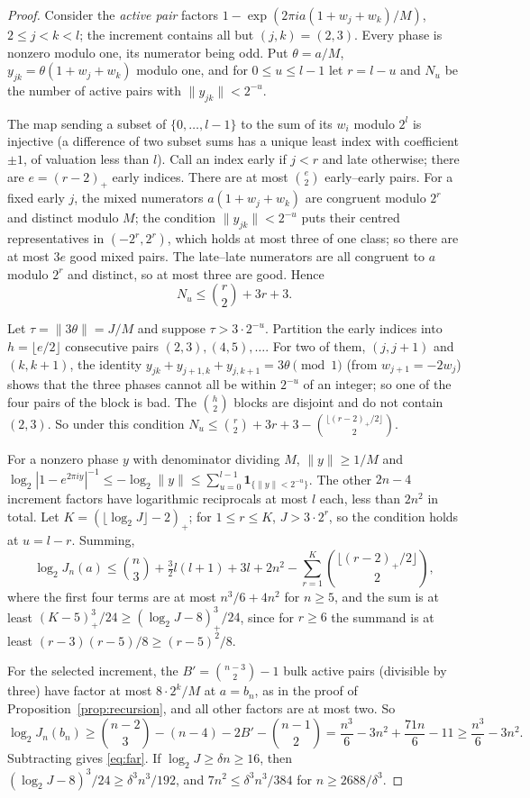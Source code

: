 \documentclass[11pt,a4paper]{article}
\theoremstyle{definition}
\begin{document}
\begin{proof}
Consider the \emph{active pair} factors $1-\exp(2\pi ia(1+w_j+w_k)/M)$,
$2\le j<k<l$; the increment contains all but $(j,k)=(2,3)$. Every phase is
nonzero modulo one, its numerator being odd. Put $\theta=a/M$,
$y_{jk}=\theta(1+w_j+w_k)$ modulo one, and for $0\le u\le l-1$ let $r=l-u$ and
$N_u$ be the number of active pairs with $\|y_{jk}\|<2^{-u}$.

The map sending a subset of $\{0,\dots,l-1\}$ to the sum of its $w_i$ modulo
$2^l$ is injective (a difference of two subset sums has a unique least index
with coefficient $\pm1$, of valuation less than $l$). Call an index early if
$j<r$ and late otherwise; there are $e=(r-2)_+$ early indices. There are at
most $\binom e2$ early--early pairs. For a fixed early $j$, the mixed numerators
$a(1+w_j+w_k)$ are congruent modulo $2^r$ and distinct modulo $M$; the condition
$\|y_{jk}\|<2^{-u}$ puts their centred representatives in $(-2^r,2^r)$, which
holds at most three of one class; so there are at most $3e$ good mixed pairs.
The late--late numerators are all congruent to $a$ modulo $2^r$ and distinct,
so at most three are good. Hence
\begin{equation}\label{eq:Nu}
 N_u\le\binom r2+3r+3 .
\end{equation}

Let $\tau=\|3\theta\|=J/M$ and suppose $\tau>3\cdot2^{-u}$. Partition the early
indices into $h=\lfloor e/2\rfloor$ consecutive pairs $(2,3),(4,5),\dots$. For
two of them, $(j,j+1)$ and $(k,k+1)$, the identity
$y_{jk}+y_{j+1,k}+y_{j,k+1}=3\theta\pmod1$ (from $w_{j+1}=-2w_j$) shows that
the three phases cannot all be within $2^{-u}$ of an integer; so one of the four
pairs of the block is bad. The $\binom h2$ blocks are disjoint and do not
contain $(2,3)$. So under this condition
$N_u\le\binom r2+3r+3-\binom{\lfloor(r-2)_+/2\rfloor}2$.

For a nonzero phase $y$ with denominator dividing $M$, $\|y\|\ge1/M$ and
$\log_2|1-e^{2\pi iy}|^{-1}\le-\log_2\|y\|\le\sum_{u=0}^{l-1}
\mathbf1_{\{\|y\|<2^{-u}\}}$. The other $2n-4$ increment factors have
logarithmic reciprocals at most $l$ each, less than $2n^2$ in total. Let
$K=(\lfloor\log_2J\rfloor-2)_+$; for $1\le r\le K$, $J>3\cdot2^r$, so the
condition holds at $u=l-r$. Summing,
\[
 \log_2J_n(a)\le\binom n3+\tfrac32l(l+1)+3l+2n^2
 -\sum_{r=1}^K\binom{\lfloor(r-2)_+/2\rfloor}2 ,
\]
where the first four terms are at most $n^3/6+4n^2$ for $n\ge5$, and the sum is
at least $(K-5)_+^3/24\ge(\log_2J-8)_+^3/24$, since for $r\ge6$ the summand is
at least $(r-3)(r-5)/8\ge(r-5)^2/8$.

For the selected increment, the $B'=\binom{n-3}2-1$ bulk active pairs
(divisible by three) have factor at most $8\cdot2^k/M$ at $a=b_n$, as in the
proof of Proposition~\ref{prop:recursion}, and all other factors are at most
two. So
\[
 \log_2J_n(b_n)\ge\binom{n-2}3-(n-4)-2B'-\binom{n-1}2
 =\frac{n^3}6-3n^2+\frac{71n}6-11\ge\frac{n^3}6-3n^2 .
\]
Subtracting gives \eqref{eq:far}. If $\log_2J\ge\delta n\ge16$, then
$(\log_2J-8)^3/24\ge\delta^3n^3/192$, and $7n^2\le\delta^3n^3/384$ for
$n\ge2688/\delta^3$.
\end{proof}
\end{document}
